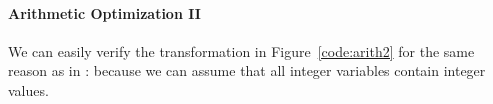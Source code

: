 

\paragraph{Arithmetic Optimization II}

We can easily verify the transformation in Figure~\ref{code:arith2}
for the same reason as in : because we can assume
that all integer variables contain integer values.


